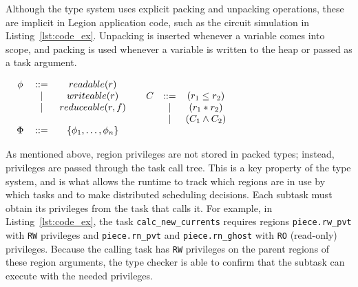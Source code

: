 Although the type system uses explicit packing and unpacking operations, 
these are implicit in Legion application code, such as the
circuit simulation in Listing~\ref{lst:code_ex}.  Unpacking is
inserted whenever a variable comes into scope, and packing is used
whenever a variable is written to the heap or passed as a task argument.


\begin{table}
\centering
{\small
\begin{math}
\begin{array}{cc}
\begin{tabular}{ccc}
$\phi$ & ::= & $readable(r)$ \\
  &$\mid$&$writeable(r)$ \\
  &$\mid$&$reduceable(r,f)$ \\
\\
$\Phi$ & ::= & $\{ \phi_1, \ldots, \phi_n \}$
\end{tabular}
&
\begin{array}{ccc}
C & ::= & (r_1 \rleq r_2) \\
  &\mid&(r_1 * r_2) \\
  &\mid&(C_1 \wedge C_2) \\
\end{array}
\end{array}
\end{math}
}
\label{tbl:priv_const}
\caption{Privileges and Constraints}
\end{table}

As mentioned above, region privileges are not stored in packed types;
instead, privileges are passed through the task call tree.  This is a key
property of the type system, and is what allows the runtime to 
track which regions are in use by which tasks and to make distributed
scheduling decisions.
Each subtask must obtain its privileges from
the task that calls it.  For example, in Listing~\ref{lst:code_ex},
the task {\tt calc\_new\_currents} requires regions {\tt piece.rw\_pvt} with {\tt RW} privileges
and {\tt piece.rn\_pvt} and {\tt piece.rn\_ghost} with {\tt RO} (read-only) privileges.  Because the calling task has {\tt RW} privileges on the parent regions of these
region arguments, the type checker is able to confirm that the subtask can execute with the needed privileges.

